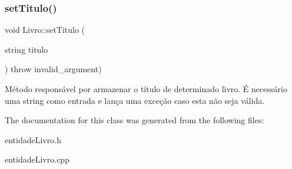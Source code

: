 \subsubsection{\texorpdfstring{set\+Titulo()}{setTitulo()}}
{\footnotesize\ttfamily void Livro\+::set\+Titulo (\begin{DoxyParamCaption}\item[{string}]{titulo }\end{DoxyParamCaption}) throw  invalid\+\_\+argument) \hspace{0.3cm}{\ttfamily [inline]}}

Método responsável por armazenar o título de determinado livro. É necessário uma string como entrada e lança uma exceção caso esta não seja válida. 

The documentation for this class was generated from the following files\+:\begin{DoxyCompactItemize}
\item 
entidade\+Livro.\+h\item 
entidade\+Livro.\+cpp\end{DoxyCompactItemize}
